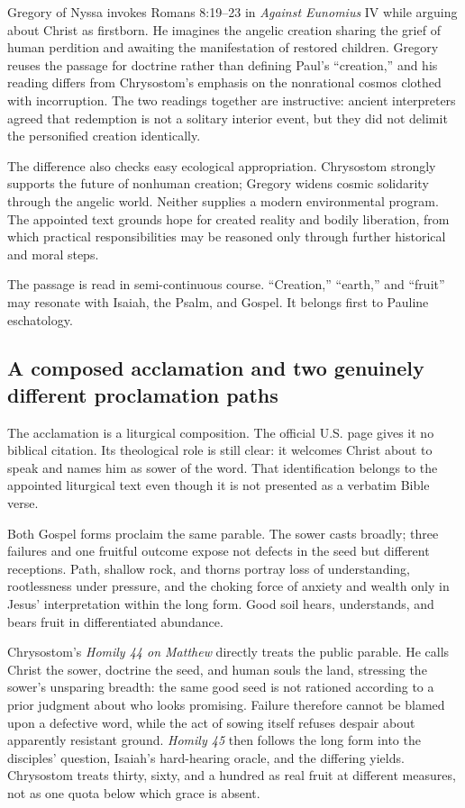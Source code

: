 Gregory of Nyssa invokes Romans 8:19--23 in \emph{Against Eunomius} IV while arguing about Christ as firstborn. He imagines the angelic creation sharing the grief of human perdition and awaiting the manifestation of restored children. Gregory reuses the passage for doctrine rather than defining Paul's “creation,” and his reading differs from Chrysostom's emphasis on the nonrational cosmos clothed with incorruption. The two readings together are instructive: ancient interpreters agreed that redemption is not a solitary interior event, but they did not delimit the personified creation identically.

The difference also checks easy ecological appropriation. Chrysostom strongly supports the future of nonhuman creation; Gregory widens cosmic solidarity through the angelic world. Neither supplies a modern environmental program. The appointed text grounds hope for created reality and bodily liberation, from which practical responsibilities may be reasoned only through further historical and moral steps.

The passage is read in semi-continuous course. “Creation,” “earth,” and “fruit” may resonate with Isaiah, the Psalm, and Gospel. It belongs first to Pauline eschatology.

\subsection*{A composed acclamation and two genuinely different proclamation paths\enspace{}}

The acclamation is a liturgical composition. The official U.S. page gives it no biblical citation. Its theological role is still clear: it welcomes Christ about to speak and names him as sower of the word. That identification belongs to the appointed liturgical text even though it is not presented as a verbatim Bible verse.

Both Gospel forms proclaim the same parable. The sower casts broadly; three failures and one fruitful outcome expose not defects in the seed but different receptions. Path, shallow rock, and thorns portray loss of understanding, rootlessness under pressure, and the choking force of anxiety and wealth only in Jesus' interpretation within the long form. Good soil hears, understands, and bears fruit in differentiated abundance.

Chrysostom's \emph{Homily 44 on Matthew} directly treats the public parable. He calls Christ the sower, doctrine the seed, and human souls the land, stressing the sower's unsparing breadth: the same good seed is not rationed according to a prior judgment about who looks promising. Failure therefore cannot be blamed upon a defective word, while the act of sowing itself refuses despair about apparently resistant ground. \emph{Homily 45} then follows the long form into the disciples' question, Isaiah's hard-hearing oracle, and the differing yields. Chrysostom treats thirty, sixty, and a hundred as real fruit at different measures, not as one quota below which grace is absent.

